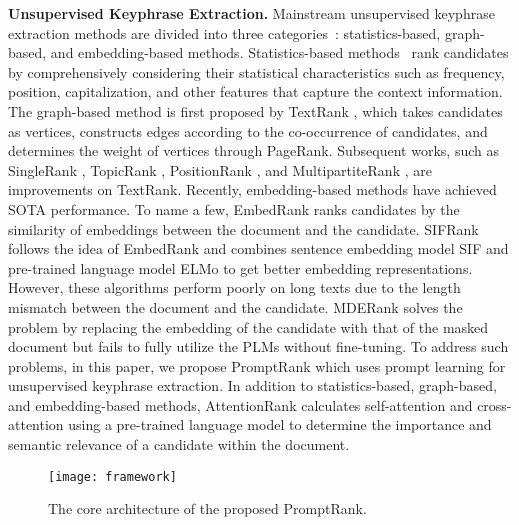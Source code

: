 \documentclass[11pt]{article}
\begin{document}
{\bf Unsupervised Keyphrase Extraction.} Mainstream unsupervised keyphrase extraction methods are divided into three categories~\cite{papagiannopoulou2020review}: statistics-based, graph-based, and embedding-based methods. Statistics-based methods~\cite{won2019automatic,campos2020yake} rank candidates by comprehensively considering their statistical characteristics such as frequency, position, capitalization, and other features that capture the context information. The graph-based method is first proposed by TextRank \cite{mihalcea-tarau-2004-textrank}, which takes candidates as vertices, constructs edges according to the co-occurrence of candidates, and determines the weight of vertices through PageRank. Subsequent works, such as SingleRank \cite{wan2008single}, TopicRank \cite{bougouin-etal-2013-topicrank}, PositionRank \cite{florescu-caragea-2017-positionrank}, and MultipartiteRank \cite{boudin-2018-unsupervised}, are improvements on TextRank. Recently, embedding-based methods have achieved SOTA performance. To name a few, EmbedRank \cite{bennani-smires-etal-2018-simple} ranks candidates by the similarity of embeddings between the document and the candidate. SIFRank \cite{8954611} follows the idea of EmbedRank and combines sentence embedding model SIF \cite{arora2017simple} and pre-trained language model ELMo \cite{peters-etal-2018-deep} to get better embedding representations. However, these algorithms perform poorly on long texts due to the length mismatch between the document and the candidate. MDERank \cite{zhang-etal-2022-mderank} solves the problem by replacing the embedding of the candidate with that of the masked document but fails to fully utilize the PLMs without fine-tuning. To address such problems, in this paper, we propose PromptRank which uses prompt learning for unsupervised keyphrase extraction. In addition to statistics-based, graph-based, and embedding-based methods, AttentionRank \cite{ding-luo-2021-attentionrank} calculates self-attention and cross-attention using a pre-trained language model to determine the importance and semantic relevance of a candidate within the document. 


\begin{figure*}[t]
\centerline{\texttt{[image: framework]}}
\caption{The core architecture of the proposed PromptRank.} 
\label{fg: architecture}
\end{figure*}
\end{document}

